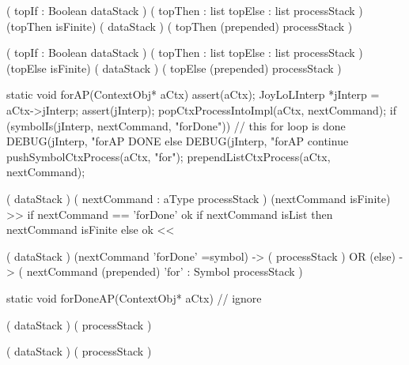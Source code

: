 \preDataStack
  (
    topIf : Boolean
    dataStack
  )
\preProcessStack
  (
    topThen : list
    topElse : list
    processStack
  )
\preConditions
  (topThen isFinite)
\postDataStack
  (
    dataStack
  )
\postProcessStack
  (
    topThen (prepended)
    processStack
  )
\postConditions
\stopRule

\preDataStack
  (
    topIf : Boolean
    dataStack
  )
\preProcessStack
  (
    topThen : list
    topElse : list
    processStack
  )
\preConditions
  (topElse isFinite)
\postDataStack
  (
    dataStack
  )
\postProcessStack
  (
    topElse (prepended)
    processStack
  )
\postConditions
\stopRule

\stopJoyLoLWord

\startCCode
static void forAP(ContextObj* aCtx) {
  assert(aCtx);
  JoyLoLInterp *jInterp = aCtx->jInterp;
  assert(jInterp);
  popCtxProcessIntoImpl(aCtx, nextCommand);
  if (symbolIs(jInterp, nextCommand, "forDone")) {
    // this for loop is done
    DEBUG(jInterp, "forAP DONE%
  } else {
    DEBUG(jInterp, "forAP continue%
    pushSymbolCtxProcess(aCtx, "for");
    prependListCtxProcess(aCtx, nextCommand);
  }
}
\stopCCode

\starttyping

\startWord[for]
\preDataStack
  (
    dataStack
  )
\preProcessStack
  (
    nextCommand : aType
    processStack
  )
\preConditions
  (nextCommand isFinite)  >> if nextCommand == 'forDone' ok
                             if nextCommand isList then nextCommand isFinite
                             else ok <<
\stopPreStack

\postDataStack
  (
    dataStack
  )
\postProcessStack
  (nextCommand 'forDone' =symbol) -> (
    processStack
  )
  OR
  (else) -> (
    nextCommand (prepended)
    'for' : Symbol
    processStack
  )
\postConditions
\stopPostStack

\stopWord

\stoptyping

\startCCode
static void forDoneAP(ContextObj* aCtx) {
  // ignore
}
\stopCCode

\starttyping

\startWord[forDone]

\preDataStack
  ( dataStack )
\preProcessStack
  ( processStack )
\preConditions
\stopPreStack

\postDataStack
  ( dataStack )
\postProcessStack
  ( processStack )
\postConditions
\stopPostStack

\stopWord


